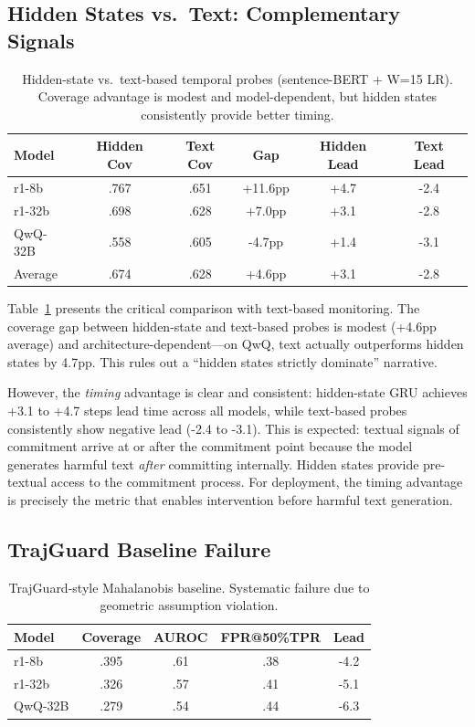 \documentclass[11pt,a4paper]{article}
\begin{document}
\subsection{Hidden States vs.\ Text: Complementary Signals}
\label{sec:text}

\begin{table}[t]
\centering
\small
\begin{tabular}{lccccc}
\toprule
Model & Hidden Cov & Text Cov & Gap & Hidden Lead & Text Lead \\
\midrule
r1-8b & .767 & .651 & +11.6pp & +4.7 & -2.4 \\
r1-32b & .698 & .628 & +7.0pp & +3.1 & -2.8 \\
QwQ-32B & .558 & .605 & -4.7pp & +1.4 & -3.1 \\
Average & .674 & .628 & +4.6pp & +3.1 & -2.8 \\
\bottomrule
\end{tabular}
\caption{Hidden-state vs.\ text-based temporal probes (sentence-BERT + W=15 LR). Coverage advantage is modest and model-dependent, but hidden states consistently provide better timing.}
\label{tab:text}
\end{table}

Table~\ref{tab:text} presents the critical comparison with text-based monitoring. The coverage gap between hidden-state and text-based probes is modest (+4.6pp average) and architecture-dependent---on QwQ, text actually outperforms hidden states by 4.7pp. This rules out a ``hidden states strictly dominate'' narrative.

However, the \emph{timing} advantage is clear and consistent: hidden-state GRU achieves +3.1 to +4.7 steps lead time across all models, while text-based probes consistently show negative lead (-2.4 to -3.1). This is expected: textual signals of commitment arrive at or after the commitment point because the model generates harmful text \emph{after} committing internally. Hidden states provide pre-textual access to the commitment process. For deployment, the timing advantage is precisely the metric that enables intervention before harmful text generation.

\subsection{TrajGuard Baseline Failure}
\label{sec:trajguard}

\begin{table}[t]
\centering
\small
\begin{tabular}{lcccc}
\toprule
Model & Coverage & AUROC & FPR@50\%TPR & Lead \\
\midrule
r1-8b & .395 & .61 & .38 & -4.2 \\
r1-32b & .326 & .57 & .41 & -5.1 \\
QwQ-32B & .279 & .54 & .44 & -6.3 \\
\bottomrule
\end{tabular}
\caption{TrajGuard-style Mahalanobis baseline. Systematic failure due to geometric assumption violation.}
\label{tab:trajguard}
\end{table}
\end{document}
